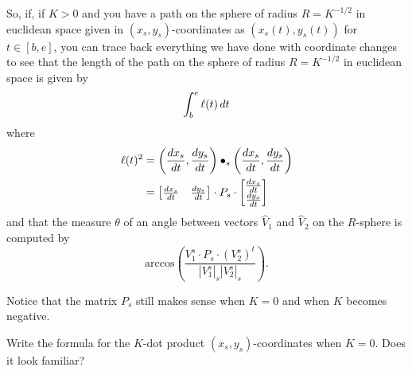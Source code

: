 \documentclass{ximera}
\begin{document}
So, if, if $K>0$ and you have a path on the sphere of radius
$R=K^{-1/2}$ in euclidean space given in $\left( x_{s},y_{s}\right)
$-coordinates as $\left( x_{s}\left( t\right) ,y_{s}\left( t\right)
\right) $ for $t\in\left[ b,e\right] $, you can trace back everything
we have done with coordinate changes to see that the length of the
path on the sphere of radius $R=K^{-1/2}$ in euclidean space is given
by
\[
\int_b^e\ell(t)\,d t
\]
where%
\begin{align*}
\l(t)^{2} &=\left(  \frac{dx_{s}}{dt},\frac{dy_{s}}%
{dt}\right)  \bullet_{s}\left(  \frac{dx_{s}}{dt},\frac{dy_{s}}{dt}\right) \\
&=
\begin{bmatrix}
\frac{dx_{s}}{dt} & \frac{dy_{s}}{dt}%
\end{bmatrix}
\cdot P_{s}\cdot
\begin{bmatrix}
\frac{dx_{s}}{dt}\\
\frac{dy_{s}}{dt}%
\end{bmatrix}
\end{align*}
and that the measure $\theta$ of an angle between vectors $\hat{V}_{1}$ and
$\hat{V}_{2}$ on the $R$-sphere is computed by%
\[
\mathrm{arccos}\left(  \frac{V_{1}^{s}\cdot P_{s}\cdot\left(  V_{2}%
^{s}\right)  ^{t}}{\left\vert V_{1}^{s}\right\vert _{s}\left\vert V_{2}%
^{s}\right\vert _{s}}\right)  .
\]


Notice that the matrix $P_{s}$ still makes sense when $K=0$ and when
$K$ becomes negative.

\begin{problem}
Write the formula for the $K$-dot product $\left(  x_{s},y_{s}\right)
$-coordinates when $K=0$. Does it look familiar?
\end{problem}
\end{document}
